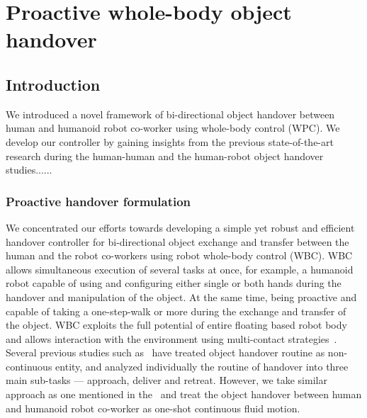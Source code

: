 	
{\color{blue}\chapter{Proactive whole-body object handover}\label{handover chapter}}


\section{Introduction}\label{introduction}

We introduced a novel framework of bi-directional object handover between human and humanoid robot co-worker using whole-body control (WPC). We develop our controller by gaining insights from the previous state-of-the-art research during the human-human and the human-robot object handover studies......


\subsection{Proactive handover formulation}\label{handover formulation}

We concentrated our efforts towards developing a simple yet robust and efficient handover controller for bi-directional object exchange and transfer between the human and the robot co-workers using robot whole-body control (WBC). WBC allows simultaneous execution of several tasks at once, for example, a humanoid robot capable of using and configuring either single or both hands during the handover and manipulation of the object. At the same time, being proactive and capable of taking a one-step-walk or more during the exchange and transfer of the object. WBC exploits the full potential of entire floating based robot body and allows interaction with the environment using multi-contact strategies~\cite{ladder-HRP-2Kai}. Several previous studies such as~\cite{strabala2013toward, huber2008human} have treated object handover routine as non-continuous entity, and analyzed individually the routine of handover into three main sub-tasks — approach, deliver and retreat. However, we take similar approach as one mentioned in the~\cite{medina2016human, nemlekarprompt} and treat the object handover between human and humanoid robot co-worker as one-shot continuous fluid motion.


